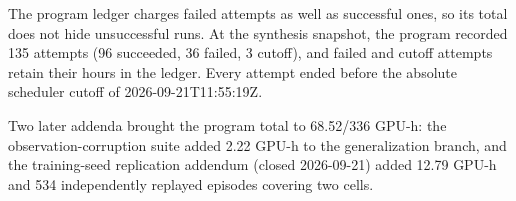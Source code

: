 The program ledger charges failed attempts as well as successful ones, so its total does not hide unsuccessful runs. At the synthesis snapshot, the program recorded 135 attempts (96 succeeded, 36 failed, 3 cutoff), and failed and cutoff attempts retain their hours in the ledger. Every attempt ended before the absolute scheduler cutoff of 2026-09-21T11:55:19Z.

Two later addenda brought the program total to 68.52/336 GPU-h: the observation-corruption suite added 2.22 GPU-h to the generalization branch, and the training-seed replication addendum (closed 2026-09-21) added 12.79 GPU-h and 534 independently replayed episodes covering two cells.

